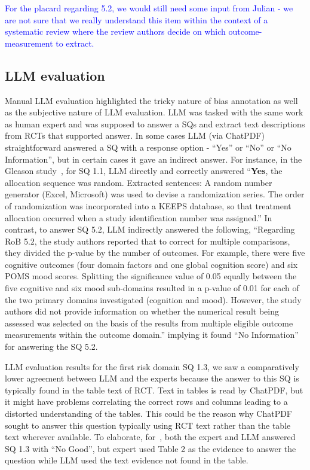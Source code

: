 \documentclass[sn-mathphys,Numbered]{sn-jnl}%
\theoremstyle{thmstyleone}%
\theoremstyle{thmstyletwo}%
\theoremstyle{thmstylethree}%
\begin{document}
\textcolor{blue}{For the placard regarding 5.2, we would still need some input from Julian - we are not sure that we really understand this item within the context of a systematic review where the review authors decide on which outcome-measurement to extract. }
%
%
%
\subsection{LLM evaluation}
\label{disc:llm}
%
Manual LLM evaluation highlighted the tricky nature of bias annotation as well as the subjective nature of LLM evaluation.
LLM was tasked with the same work as human expert and was supposed to answer a SQs and extract text descriptions from RCTs that supported answer.
In some cases LLM (via ChatPDF) straightforward answered a SQ with a response option - ``Yes'' or ``No'' or ``No Information'', but in certain cases it gave an indirect answer.
For instance, in the Gleason study~\cite{gleason2015effects}, for SQ 1.1, LLM directly and correctly answered ``\textbf{Yes}, the allocation sequence was random. Extracted sentences: A random number generator (Excel, Microsoft) was used to devise a randomization series. The order of randomization was incorporated into a KEEPS database, so that treatment allocation occurred when a study identification number was assigned.''
In contrast, to answer SQ 5.2, LLM indirectly answered the following, ``Regarding RoB 5.2, the study authors reported that to correct for multiple comparisons, they divided the p-value by the number of outcomes. For example, there were five cognitive outcomes (four domain factors and one global cognition score) and six POMS mood scores. Splitting the significance value of 0.05 equally between the five cognitive and six mood sub-domains resulted in a p-value of 0.01 for each of the two primary domains investigated (cognition and mood). However, the study authors did not provide information on whether the numerical result being assessed was selected on the basis of the results from multiple eligible outcome measurements within the outcome domain.'' implying it found ``No Information'' for answering the SQ 5.2.


LLM evaluation results for the first risk domain SQ 1.3, we saw a comparatively lower agreement between LLM and the experts because the answer to this SQ is typically found in the table text of RCT.
Text in tables is read by ChatPDF, but it might have problems correlating the correct rows and columns leading to a distorted understanding of the tables.
This could be the reason why ChatPDF sought to answer this question typically using RCT text rather than the table text wherever available.
To elaborate, for~\cite{stuck2015effect}, both the expert and LLM answered SQ 1.3 with ``No Good'', but expert used Table 2 as the evidence to answer the question while LLM used the text evidence not found in the table.
\end{document}
